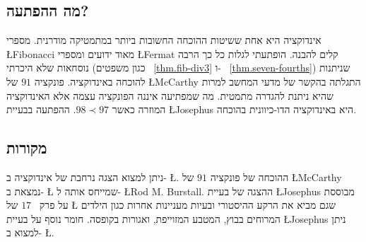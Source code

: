 
\subsection*{מה ההפתעה?}

אינדוקציה היא אחת ששיטות ההוכחה החשובות ביותר במתמטיקה מודרנית. מספרי
\L{Fibonacci}
מאוד ידועים ומספרי 
\L{Fermat}
קלים להבנה. הופתעתי לגלות כל כך הרבה נוסחאות שלא היכרתי (כגון משפטים%
~\ref{thm.fib-div3}
ו-%
~\ref{thm.seven-fourths})
שניתנות להוכחה באינדוקציה. פונקציה
$91$
של
\L{McCarthy}
התגלתה בהקשר של מדעי המחשב למרות שהיא ניתנת להגדרה מתמטית. מה שמפתיעה איננה הפונקציה עצמה אלא האינדוקציה המוזרה כאשר 
$98\prec 97$. 
ההפתעה בבעיית
\L{Josephus}
היא באינדוקציה הדו-כיוונית בהוכחה.

\subsection*{מקורות}

ניתן למצוא הצגה נרחבת של אינדוקציה ב-%
\L{\cite{gunderson}}.
ההוכחה של פונקציה 
$91$
של
\L{McCarthy}
נמצאת ב-%
\L{\cite{manna}}
שמייחס אותה ל-%
\L{Rod M. Burstall}.
ההצגה של בעיית 
\L{Josephus}
מבוססת על פרק~
$17$
של
\L{\cite{gunderson}}
שגם מביא את הרקע ההיסטורי ובעיות מעניינות אחרות כגון הילדים המרוחים בבוץ, המטבע המזוייפת, ואגורות בקופסה. חומר נוסף על בעיית
\L{Josephus}
ניתן למצוא ב-%
\L{\cite{schumer,wiki:josephus}}.
